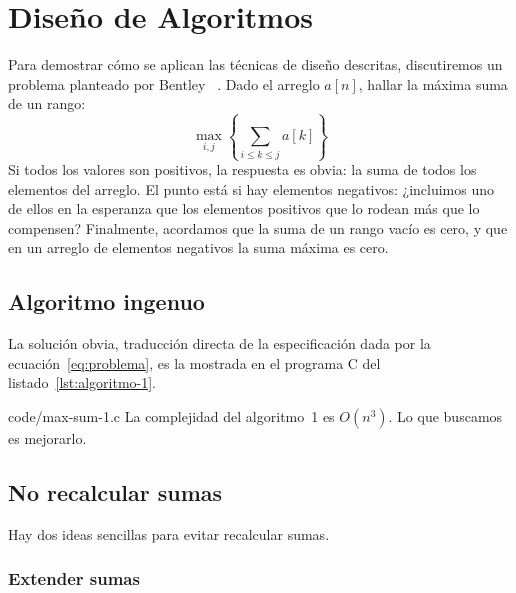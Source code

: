 

\chapter{Diseño de Algoritmos}
\label{cha:diseno-de-algoritmos}

  Para demostrar cómo se aplican las técnicas de diseño descritas,
  discutiremos un problema planteado por Bentley~%
    \cite{bentley84:_algorithm_design_techn}.
  Dado el arreglo \(a[n]\), hallar la máxima suma de un rango:
  \begin{equation}
    \label{eq:problema}
    \max_{i, j} \left\{ \sum_{i \le k \le j} a[k] \right\}
  \end{equation}
  Si todos los valores son positivos,
  la respuesta es obvia:
  la suma de todos los elementos del arreglo.
  El punto está si hay elementos negativos:
  ¿incluimos uno de ellos
  en la esperanza que los elementos positivos que lo rodean
  más que lo compensen?
  Finalmente,
  acordamos que la suma de un rango vacío es cero,
  y que en un arreglo de elementos negativos la suma máxima es cero.

\section{Algoritmo ingenuo}
\label{sec:algoritmo-1}

  La solución obvia,
  traducción directa de la especificación
  dada por la ecuación~\eqref{eq:problema},
  es la mostrada en el programa C del listado~\ref{lst:algoritmo-1}.
  
                  {code/max-sum-1.c}
  La complejidad del algoritmo~1 es \(O(n^3)\).
  Lo que buscamos es mejorarlo.

\section{No recalcular sumas}
\label{sec:no-recalcular-sumas}

  Hay dos ideas sencillas para evitar recalcular sumas.

\subsection{Extender sumas}
\label{sec:algoritmo-2}

